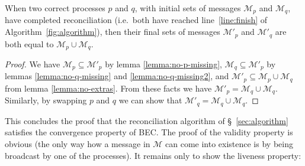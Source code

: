 \documentclass[a4paper,anonymous,USenglish]{lipics-v2019}
\begin{document}
\begin{theorem}\label{theorem:convergence}
When two correct processes $p$ and $q$, with initial sets of messages $\mathcal{M}_p$ and $\mathcal{M}_q$, have completed reconciliation (i.e.\ both have reached line~\ref{line:finish} of Algorithm~\ref{fig:algorithm}), then their final sets of messages $\mathcal{M}'_p$ and $\mathcal{M}'_q$  are both equal to $\mathcal{M}_p \cup \mathcal{M}_q$.
\end{theorem}
\begin{proof}
We have $\mathcal{M}_p \subseteq \mathcal{M}'_p$ by lemma \ref{lemma:no-p-missing}, $\mathcal{M}_q \subseteq \mathcal{M}'_p$ by lemmas \ref{lemma:no-q-missing} and \ref{lemma:no-q-missing2}, and $\mathcal{M}'_p \subseteq \mathcal{M}_p \cup \mathcal{M}_q$ from lemma \ref{lemma:no-extras}.
From these facts we have $\mathcal{M}'_p = \mathcal{M}_q \cup \mathcal{M}_q$.\\
Similarly, by swapping $p$ and $q$ we can show that $\mathcal{M}'_q = \mathcal{M}_q \cup \mathcal{M}_q$.
\end{proof}

This concludes the proof that the reconciliation algorithm of \S~\ref{sec:algorithm} satisfies the convergence property of BEC.
The proof of the validity property is obvious (the only way how a message in $\mathcal{M}$ can come into existence is by being broadcast by one of the processes).
It remains only to show the liveness property:
\end{document}
